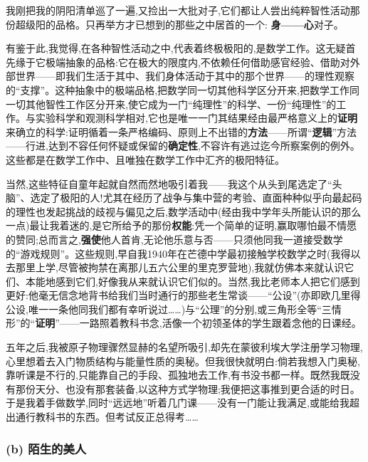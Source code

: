 我刚把我的阴阳清单巡了一遍,又捡出一大批对子,它们都让人尝出纯粹智性活动那份超级阳的品格。只再举方才已想到的那些之中居首的一个: \textbf{身——心}对子。

有鉴于此,我觉得,在各种智性活动之中,代表着终极极阳的,是数学工作。这无疑首先缘于它极端抽象的品格:它在极大的限度内,不依赖任何借助感官经验、借助对外部世界——即我们生活于其中、我们身体活动于其中的那个世界——的理性观察的“支撑”。这种抽象中的极端品格,把数学同一切其他科学区分开来,把数学工作同一切其他智性工作区分开来,使它成为一门“纯理性”的科学、一份“纯理性”的工作。与实验科学和观测科学相对,它也是唯一一门其结果经由最严格意义上的\textbf{证明}来确立的科学:证明循着一条严格编码、原则上不出错的\textbf{方法}——所谓“\textbf{逻辑}”方法——行进,达到不容任何怀疑或保留的\textbf{确定性},不容许有逃过迄今所察案例的例外。这些都是在数学工作中、且唯独在数学工作中汇齐的极阳特征。

当然,这些特征自童年起就自然而然地吸引着我——我这个从头到尾选定了“头脑”、选定了极阳的人!尤其在经历了战争与集中营的考验、直面种种似乎向最起码的理性也发起挑战的歧视与偏见之后,数学活动中(经由我中学年头所能认识的那么一点\dmark{})最让我着迷的,是它所给予的那份\textbf{权能}:凭一个简单的证明,赢取哪怕最不情愿的赞同;总而言之,\textbf{强使}他人首肯,无论他乐意与否——只须他同我一道接受数学的“游戏规则”。这些规则,早自我1940年在芒德中学最初接触学校数学之时(我得以去那里上学,尽管被拘禁在离那儿五六公里的里克罗营地),我就仿佛本来就认识它们、本能地感到它们,好像我从来就认识它们似的。当然,我比老师本人把它们感到更好:他毫无信念地背书给我们当时通行的那些老生常谈——“公设”(亦即欧几里得公设,唯一一条他同我们都有幸听说过……)与“公理”的分别,或三角形全等“三情形”的“\textbf{证明}”——一路照着教科书念,活像一个初领圣体的学生跟着念他的日课经。

五年之后,我被原子物理骤然显赫的名望所吸引,却先在蒙彼利埃大学注册学习物理,心里想着去入门物质结构与能量性质的奥秘。但我很快就明白:倘若我想入门奥秘,靠听课是不行的,只能靠自己的手段、孤独地去工作,有书没书都一样。既然我既没有那份天分、也没有那套装备,以这种方式学物理;我便把这事推到更合适的时日。于是我着手做数学,同时“远远地”听着几门课——没有一门能让我满足,或能给我超出通行教科书的东西。但考试反正总得考……

\subsubsection*{(b) 陌生的美人}
\label{ch18:local:h28}

